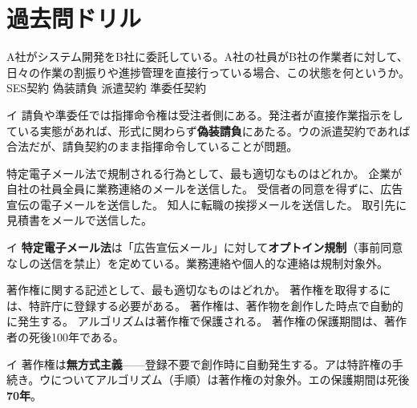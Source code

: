 \section{過去問ドリル}


\begin{itpmon}{%
A社がシステム開発をB社に委託している。A社の社員がB社の作業者に対して、日々の作業の割振りや進捗管理を直接行っている場合、この状態を何というか。}
\sentakushi
  {SES契約}
  {偽装請負}
  {派遣契約}
  {準委任契約}
\end{itpmon}
\begin{kaisetsu}{イ}
請負や準委任では指揮命令権は受注者側にある。発注者が直接作業指示をしている実態があれば、形式に関わらず\textbf{偽装請負}にあたる。ウの派遣契約であれば合法だが、請負契約のまま指揮命令していることが問題。
\end{kaisetsu}

\begin{itpmon}{%
特定電子メール法で規制される行為として、最も適切なものはどれか。}
\sentakushi
  {企業が自社の社員全員に業務連絡のメールを送信した。}
  {受信者の同意を得ずに、広告宣伝の電子メールを送信した。}
  {知人に転職の挨拶メールを送信した。}
  {取引先に見積書をメールで送信した。}
\end{itpmon}
\begin{kaisetsu}{イ}
\textbf{特定電子メール法}は「広告宣伝メール」に対して\textbf{オプトイン規制}（事前同意なしの送信を禁止）を定めている。業務連絡や個人的な連絡は規制対象外。
\end{kaisetsu}

\begin{itpmon}{%
著作権に関する記述として、最も適切なものはどれか。}
\sentakushi
  {著作権を取得するには、特許庁に登録する必要がある。}
  {著作権は、著作物を創作した時点で自動的に発生する。}
  {アルゴリズムは著作権で保護される。}
  {著作権の保護期間は、著作者の死後100年である。}
\end{itpmon}
\begin{kaisetsu}{イ}
著作権は\textbf{無方式主義}——登録不要で創作時に自動発生する。アは特許権の手続き。ウについてアルゴリズム（手順）は著作権の対象外。エの保護期間は死後\textbf{70年}。
\end{kaisetsu}


